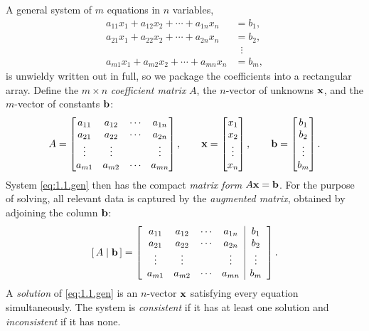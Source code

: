 A general system of $m$ equations in $n$ variables,
\begin{equation}\label{eq:1.1.gen}
\begin{aligned}
a_{11}x_1 + a_{12}x_2 + \cdots + a_{1n}x_n &= b_1,\\
a_{21}x_1 + a_{22}x_2 + \cdots + a_{2n}x_n &= b_2,\\
&\;\;\vdots\\
a_{m1}x_1 + a_{m2}x_2 + \cdots + a_{mn}x_n &= b_m,
\end{aligned}
\end{equation}
is unwieldy written out in full, so we package the coefficients into a rectangular array. Define the $m\times n$ \emph{coefficient matrix} $A$, the $n$-vector of unknowns $\mathbf{x}$, and the $m$-vector of constants $\mathbf{b}$:
\[
A=\begin{bmatrix} a_{11}&a_{12}&\cdots&a_{1n}\\ a_{21}&a_{22}&\cdots&a_{2n}\\ \vdots&\vdots&&\vdots\\ a_{m1}&a_{m2}&\cdots&a_{mn}\end{bmatrix},\qquad
\mathbf{x}=\begin{bmatrix}x_1\\x_2\\\vdots\\x_n\end{bmatrix},\qquad
\mathbf{b}=\begin{bmatrix}b_1\\b_2\\\vdots\\b_m\end{bmatrix}.
\]
System \eqref{eq:1.1.gen} then has the compact \emph{matrix form} $A\mathbf{x}=\mathbf{b}$. For the purpose of solving, all relevant data is captured by the \emph{augmented matrix}, obtained by adjoining the column $\mathbf{b}$:
\[
[\,A\mid \mathbf{b}\,]=\left[\begin{array}{cccc|c}
a_{11}&a_{12}&\cdots&a_{1n}&b_1\\
a_{21}&a_{22}&\cdots&a_{2n}&b_2\\
\vdots&\vdots&&\vdots&\vdots\\
a_{m1}&a_{m2}&\cdots&a_{mn}&b_m
\end{array}\right].
\]
A \emph{solution} of \eqref{eq:1.1.gen} is an $n$-vector $\mathbf{x}$ satisfying every equation simultaneously. The system is \emph{consistent} if it has at least one solution and \emph{inconsistent} if it has none.

